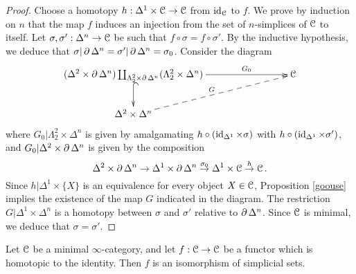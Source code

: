 \begin{proof}
Choose a homotopy $h: \Delta^1 \times \operatorname{\mathcal{C}} \rightarrow \operatorname{\mathcal{C}}$ from $\operatorname{id}_{\operatorname{\mathcal{C}}}$ to $f$.
We prove by induction on $n$ that the map $f$ induces an injection from the set of
$n$-simplices of $\operatorname{\mathcal{C}}$ to itself.
Let $\sigma, \sigma': \Delta^n \rightarrow \operatorname{\mathcal{C}}$ be such that
$f \circ \sigma = f \circ \sigma'$. By the inductive hypothesis, we deduce that
$\sigma | \operatorname{\partial} \Delta^n = \sigma' | \operatorname{\partial} \Delta^n = \sigma_0$. Consider the diagram
$$ \xymatrix{ 
(\Delta^2 \times \bd \Delta^n) \coprod_{ \Lambda^2_2 \times \bd \Delta^n }
( \Lambda^2_2 \times \Delta^n ) \ar[rrr]^-{G_0} \ar@{^{(}->}[d] & & & \calC \\
\Delta^2 \times \Delta^n \ar@{-->}[urrr]^{G} & & & }$$
where $G_0| \Lambda^2_2 \times \Delta^n$ is given by amalgamating
$h \circ (\operatorname{id}_{\Delta^1} \times \sigma)$ with $h \circ (\operatorname{id}_{ \Delta^1} \times \sigma')$, and
$G_0 | \Delta^2 \times \operatorname{\partial} \Delta^n$ is given by the composition
$$ \Delta^2 \times \operatorname{\partial} \Delta^n \rightarrow \Delta^1 \times \operatorname{\partial} \Delta^n
\stackrel{\sigma_0}{\rightarrow} \Delta^1 \times \operatorname{\mathcal{C}} \stackrel{h}{\rightarrow} \operatorname{\mathcal{C}}.$$
Since $h| \Delta^1 \times \{X\}$ is an equivalence for every object
$X \in \operatorname{\mathcal{C}}$, Proposition \ref{goouse} implies the existence of the map $G$ indicated in the diagram. The restriction $G|\Delta^1 \times \Delta^n$ is a homotopy between
$\sigma$ and $\sigma'$ relative to $\operatorname{\partial} \Delta^n$. Since $\operatorname{\mathcal{C}}$ is minimal, we deduce that $\sigma = \sigma'$.
\end{proof}

\begin{lemma}\label{stsst}
Let $\operatorname{\mathcal{C}}$ be a minimal $\infty$-category, and let $f: \operatorname{\mathcal{C}} \rightarrow \operatorname{\mathcal{C}}$ be a functor
which is homotopic to the identity. Then $f$ is an isomorphism of simplicial sets.
\end{lemma}

